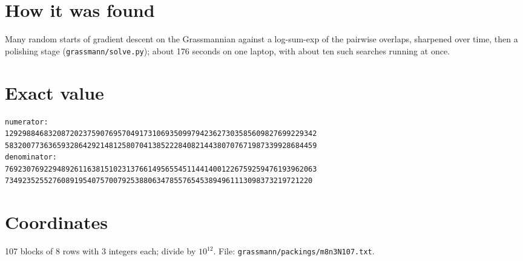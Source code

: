 \documentclass[11pt,a4paper]{article}
\begin{document}
\section{How it was found}
Many random starts of gradient descent on the Grassmannian against a log-sum-exp of the pairwise overlaps, sharpened over time, then a polishing stage (\texttt{grassmann/solve.py}); about 176 seconds on one laptop, with about ten such searches running at once.


\appendix
\section{Exact value}
{\small
\begin{verbatim}
numerator:
129298846832087202375907695704917310693509979423627303585609827699229342
583200773636593286429214812580704138522284082144380707671987339928684459
denominator:
769230769229489261163815102313766149565545114414001226759259476193962063
73492352552760891954075700792538806347855765453894961113098373219721220
\end{verbatim}}

\section{Coordinates}
107 blocks of 8 rows with 3 integers each; divide by $10^{12}$. File: \texttt{grassmann/packings/m8n3N107.txt}.
{\tiny
\begin{multicols}{3}
\end{multicols}}
\end{document}
